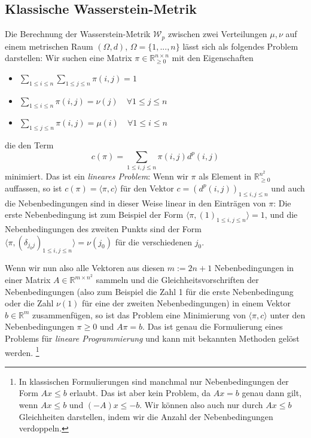 \subsection{Klassische Wasserstein-Metrik}
Die Berechnung der Wasserstein-Metrik $\mathcal{W}_p$ zwischen zwei Verteilungen $\mu, \nu$ auf einem metrischen Raum $(\Omega, d)$, $\Omega=\{1,...,n\}$ lässt sich als folgendes Problem darstellen: Wir suchen eine Matrix $\pi \in \mathbb{R}_{\geq 0}^{n\times n}$ mit den Eigenschaften
\begin{itemize}
    \item $\sum_{1\leq i\leq n} \sum_{1\leq j \leq n} \pi(i,j) = 1$
    \item $\sum_{1\leq i \leq n} \pi(i,j) = \nu(j) \quad\forall 1\leq j \leq n$
    \item $\sum_{1\leq j \leq n} \pi(i,j) = \mu(i) \quad\forall 1\leq i \leq n$
\end{itemize}
die den Term
$$c(\pi) = \sum_{1\leq i,j\leq n} \pi(i,j) d^p(i,j)$$ 
minimiert. Das ist ein \emph{lineares Problem}: Wenn wir $\pi$ als Element in $\mathbb{R}_{\geq 0}^{n^2}$ auffassen, so ist $c(\pi) = \langle \pi, c \rangle$ für den Vektor $c=(d^p(i,j))_{1\leq i,j\leq n}$ und auch die Nebenbedingungen sind in dieser Weise linear in den Einträgen von $\pi$: Die erste Nebenbedingung ist zum Beispiel der Form $\langle \pi, (1)_{1\leq i,j\leq n}\rangle = 1$, und die Nebenbedingungen des zweiten Punkts sind der Form  $\langle \pi, (\delta_{j_0j})_{1\leq i,j\leq n}\rangle = \nu(j_0)$ für die verschiedenen $j_0$.

Wenn wir nun also alle Vektoren aus diesen $m:=2n+1$ Nebenbedingungen in einer Matrix $A \in \mathbb{R}^{m \times n^2}$ sammeln und die Gleichheitsvorschriften der Nebenbedingungen (also zum Beispiel die Zahl 1 für die erste Nebenbedingung oder die Zahl $\nu(1)$ für eine der zweiten Nebenbedingungen) in einem Vektor $b \in \mathbb{R}^m$ zusammenfügen, so ist das Problem eine Minimierung von $\langle \pi, c\rangle$ unter den Nebenbedingungen $\pi \geq 0$ und $A\pi = b$. Das ist genau die Formulierung eines Problems für \emph{lineare Programmierung} und kann mit bekannten Methoden gelöst werden. \footnote{In klassischen Formulierungen sind manchmal nur Nebenbedingungen der Form $Ax \leq b$ erlaubt. Das ist aber kein Problem, da $Ax=b$ genau dann gilt, wenn $Ax\leq b$ und $(-A)x \leq -b$. Wir können also auch nur durch $Ax \leq b$ Gleichheiten darstellen, indem wir die Anzahl der Nebenbedingungen verdoppeln. }%

